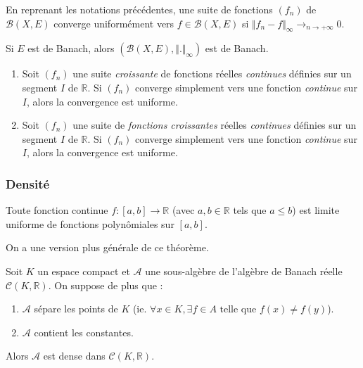 	\begin{proposition}
		En reprenant les notations précédentes, une suite de fonctions $(f_n)$ de $\mathcal{B}(X,E)$ converge uniformément vers $f \in \mathcal{B}(X,E)$ si $\Vert f_n - f \Vert_\infty \longrightarrow_{n \rightarrow +\infty} 0$.
	\end{proposition}

	\begin{proposition}
		Si $E$ est de Banach, alors $(\mathcal{B}(X,E), \Vert . \Vert_\infty)$ est de Banach.
	\end{proposition}


	\begin{theorem}
		\begin{enumerate}[label=(\roman*)]
			\item Soit $(f_n)$ une suite \textit{croissante} de fonctions réelles \textit{continues} définies sur un segment $I$ de $\mathbb{R}$. Si $(f_n)$ converge simplement vers une fonction \textit{continue} sur $I$, alors la convergence est uniforme.
			\item Soit $(f_n)$ une suite de \textit{fonctions croissantes} réelles \textit{continues} définies sur un segment $I$ de $\mathbb{R}$. Si $(f_n)$ converge simplement vers une fonction \textit{continue} sur $I$, alors la convergence est uniforme.
		\end{enumerate}
	\end{theorem}

	\subsubsection{Densité}


	\begin{theorem}[Weierstrass]
		Toute fonction continue $f : [a,b] \rightarrow \mathbb{R}$ (avec $a, b \in \mathbb{R}$ tels que $a \leq b$) est limite uniforme de fonctions polynômiales sur $[a, b]$.
	\end{theorem}

	On a une version plus générale de ce théorème.


	\begin{theorem}
		Soit $K$ un espace compact et $\mathcal{A}$ une sous-algèbre de l'algèbre de Banach réelle $\mathcal{C}(K, \mathbb{R})$. On suppose de plus que :
		\begin{enumerate}[label=(\roman*)]
			\item $\mathcal{A}$ sépare les points de $K$ (ie. $\forall x \in K, \exists f \in A \text{ telle que } f(x) \neq f(y)$).
			\item $\mathcal{A}$ contient les constantes.
		\end{enumerate}
		Alors $\mathcal{A}$ est dense dans $\mathcal{C}(K, \mathbb{R})$.
	\end{theorem}

